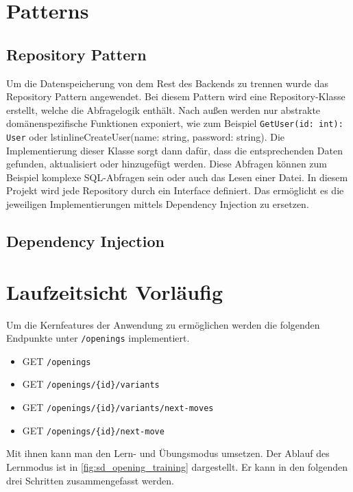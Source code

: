\section{Patterns}

\subsection{Repository Pattern}
Um die Datenspeicherung von dem Rest des Backends zu trennen wurde das Repository Pattern angewendet. Bei diesem Pattern wird eine Repository-Klasse erstellt, welche die Abfragelogik enthält. Nach außen werden nur abstrakte domänenspezifische Funktionen exponiert, wie zum Beispiel \lstinline{GetUser(id: int): User} oder lstinline{CreateUser(name: string, password: string)}. Die Implementierung dieser Klasse sorgt dann dafür, dass die entsprechenden Daten gefunden, aktualisiert oder hinzugefügt werden. Diese Abfragen können zum Beispiel komplexe SQL-Abfragen sein oder auch das Lesen einer Datei. In diesem Projekt wird jede Repository durch ein Interface definiert. Das ermöglicht es die jeweiligen Implementierungen mittels Dependency Injection zu ersetzen. \cite{evans_domain-driven_2004}

\subsection{Dependency Injection}

\section{Laufzeitsicht Vorläufig}
Um die Kernfeatures der Anwendung zu ermöglichen werden die folgenden Endpunkte unter \lstinline{/openings} implementiert.

\begin{itemize}
    \item GET \verb|/openings|
    \item GET \verb|/openings/{id}/variants|
    \item GET \verb|/openings/{id}/variants/next-moves|
    \item GET \verb|/openings/{id}/next-move|
\end{itemize}

Mit ihnen kann man den Lern- und Übungsmodus umsetzen. Der Ablauf des Lernmodus ist in \autoref{fig:sd_opening_training} dargestellt. Er kann in den folgenden drei Schritten zusammengefasst werden.

